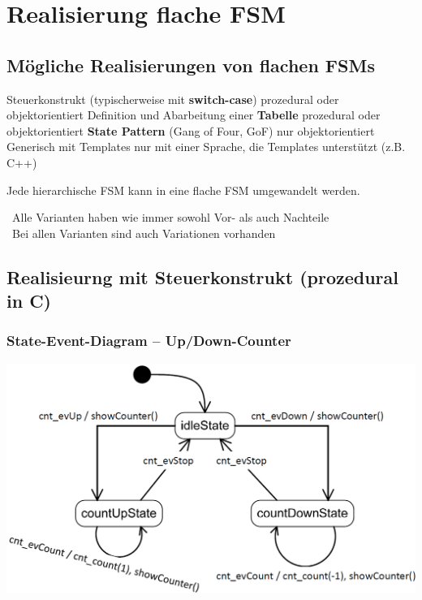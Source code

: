 \section{Realisierung flache FSM}

\subsection{Mögliche Realisierungen von flachen FSMs}

\begin{outline}
    \1 Steuerkonstrukt (typischerweise mit \textbf{switch-case})
        \2 prozedural oder objektorientiert
    \1 Definition und Abarbeitung einer \textbf{Tabelle}
        \2 prozedural oder objektorientiert
    \1 \textbf{State Pattern} (Gang of Four, GoF)
        \2 nur objektorientiert
    \1 Generisch mit Templates
        \2 nur mit einer Sprache, die Templates unterstützt (z.B. C++)
\end{outline}

\vspace{0.2cm}

Jede hierarchische FSM kann in eine flache FSM umgewandelt werden.
\vspace{0.1cm}

\textrightarrow\ Alle Varianten haben wie immer sowohl Vor- als auch Nachteile \\
\textrightarrow\ Bei allen Varianten sind auch Variationen vorhanden


\subsection{Realisieurng mit Steuerkonstrukt (prozedural in C)}

\subsubsection{State-Event-Diagram -- Up/Down-Counter}

\begin{center}
    \includegraphics[width=0.7\columnwidth]{images/fsm_up-down-counter_diagramm_C.png}
\end{center}


